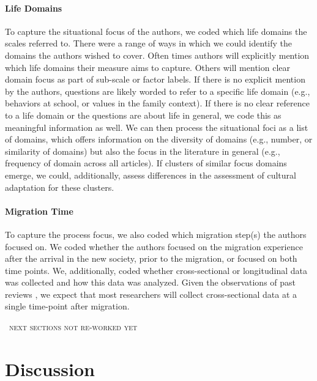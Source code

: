 \documentclass[man, 12pt, a4paper]{apa7}
\newcommand\Warning[1][2ex]{%
  \renewcommand\stacktype{L}%
  \scaleto{\stackon[1.3pt]{\color{red}$\triangle$}{\tiny\bfseries !}}{#1}}%
\begin{document}
\paragraph{Life Domains}
To capture the situational focus of the authors, we coded which life domains the scales referred to. There were a range of ways in which we could identify the domains the authors wished to cover. Often times authors will explicitly mention which life domains their measure aims to capture. Others will mention clear domain focus as part of sub-scale or factor labels. If there is no explicit mention by the authors, questions are likely worded to refer to a specific life domain (e.g., behaviors at school, or values in the family context). If there is no clear reference to a life domain or the questions are about life in general, we code this as meaningful information as well. We can then process the situational foci as a list of domains, which offers information on the diversity of domains (e.g., number, or similarity of domains) but also the focus in the literature in general (e.g., frequency of domain across all articles). If clusters of similar focus domains emerge, we could, additionally, assess differences in the assessment of cultural adaptation for these clusters.

\paragraph{Migration Time}
To capture the process focus, we also coded which migration step(s) the authors focused on. We coded whether the authors focused on the migration experience after the arrival in the new society, prior to the migration, or focused on both time points. We, additionally, coded whether cross-sectional or longitudinal data was collected and how this data was analyzed. Given the observations of past reviews \citep[e.g.,][]{Brown2011, Ward2019}, we expect that most researchers will collect cross-sectional data at a single time-point after migration.



\begin{center}
    \Warning\ \textsc{next sections not re-worked yet} \Warning
\end{center}

\section{Discussion}
\end{document}
